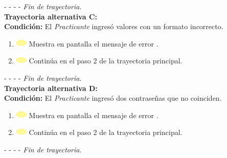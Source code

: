 - - - - \textit{Fin de trayectoria.} \\

\textbf{\large{Trayectoria alternativa C:}} \\
\textbf{Condición: } El \textit{Practicante} ingresó valores con un formato incorrecto.

\begin{enumerate}
	\item \includegraphics[width=15pt]{./Figuras/iconosCU/herramienta.png} Muestra en pantalla el mensaje de error .
	\item \includegraphics[width=15pt]{./Figuras/iconosCU/herramienta.png} Continúa en el paso 2 de la trayectoria principal.
\end{enumerate}

- - - - \textit{Fin de trayectoria.} \\

\textbf{\large{Trayectoria alternativa D:}} \\
\textbf{Condición: } El \textit{Practicante} ingresó dos contraseñas que no coinciden.

\begin{enumerate}
	\item \includegraphics[width=15pt]{./Figuras/iconosCU/herramienta.png} Muestra en pantalla el mensaje de error .
	\item \includegraphics[width=15pt]{./Figuras/iconosCU/herramienta.png} Continúa en el paso 2 de la trayectoria principal.
\end{enumerate}

- - - - \textit{Fin de trayectoria.} \\
\clearpage